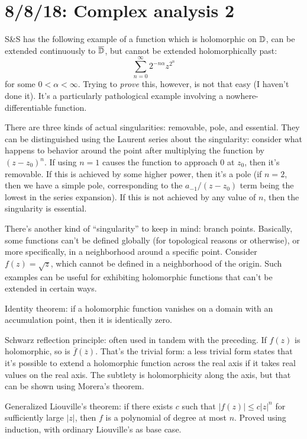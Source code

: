 \section{8/8/18: Complex analysis 2}
S\&S has the following example of a function which is holomorphic on $\mathbb{D}$, can be extended continuously to $\overline{\mathbb{D}}$, but cannot be extended holomorphically past:
\[
	\sum_{n=0}^\infty 2^{-n\alpha}z^{2^n}
\]
for some $0<\alpha<\infty$. Trying to \emph{prove} this, however, is not that easy (I haven't done it). It's a particularly pathological example involving a nowhere-differentiable function.

There are three kinds of actual singularities: removable, pole, and essential. They can be distinguished using the Laurent series about the singularity: consider what happens to behavior around the point after multiplying the function by $(z-z_0)^n$. If using $n=1$ causes the function to approach 0 at $z_0$, then it's removable. If this is achieved by some higher power, then it's a pole (if $n=2$, then we have a simple pole, corresponding to the $a_{-1}/(z-z_0)$ term being the lowest in the series expansion). If this is not achieved by any value of $n$, then the singularity is essential.

There's another kind of ``singularity'' to keep in mind: branch points. Basically, some functions can't be defined globally (for topological reasons or otherwise), or more specifically, in a neighborhood around a specific point. Consider $f(z) = \sqrt{z}$, which cannot be defined in a neighborhood of the origin. Such examples can be useful for exhibiting holomorphic functions that can't be extended in certain ways.

Identity theorem: if a holomorphic function vanishes on a domain with an accumulation point, then it is identically zero.

Schwarz reflection principle: often used in tandem with the preceding. If $f(z)$ is holomorphic, so is $\overline f(\overline{z})$. That's the trivial form: a less trivial form states that it's possible to extend a holomorphic function across the real axis if it takes real values on the real axis. The subtlety is holomorphicity along the axis, but that can be shown using Morera's theorem.

Generalized Liouville's theorem: if there exists $c$ such that $|f(z)| \leq c|z|^n$ for sufficiently large $|z|$, then $f$ is a polynomial of degree at most $n$. Proved using induction, with ordinary Liouville's as base case.

